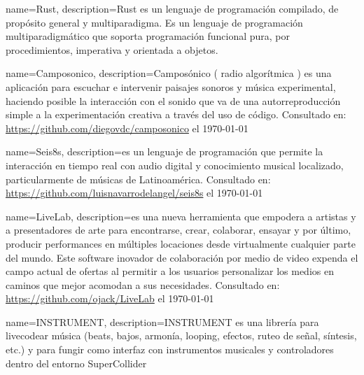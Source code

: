                 {
                   name=Rust,
    description={Rust es un lenguaje de programación compilado, de propósito general y multiparadigma. Es un lenguaje de programación multiparadigmático que soporta programación funcional pura, por procedimientos, imperativa y orientada a objetos.}}


                 {
                   name=Camposonico,
    description={Camposónico ( radio algorítmica ) es una aplicación para escuchar e intervenir paisajes sonoros y música experimental, haciendo posible la interacción con el sonido que va de una autorreproducción simple a la experimentación creativa a través del uso de código. Consultado en: \url{https://github.com/diegovdc/camposonico} el \today}}

                 {
                   name=Seis8s,
    description={es un lenguaje de programación que permite la interacción en tiempo real con audio digital y conocimiento musical localizado, particularmente de músicas de Latinoamérica. Consultado en: \url{https://github.com/luisnavarrodelangel/seis8s} el \today}}


                 {
                   name=LiveLab,
    description={es una nueva herramienta que empodera a artistas y a presentadores de arte para encontrarse, crear, colaborar, ensayar y por último, producir performances en múltiples locaciones desde virtualmente cualquier parte del mundo. Este software inovador de colaboración por medio de video expenda el campo actual de ofertas al permitir a los usuarios personalizar los medios en caminos que mejor acomodan a sus necesidades. Consultado en: \url{https://github.com/ojack/LiveLab} el \today}}


                 {
                   name=INSTRUMENT,
    description={INSTRUMENT es una librería para livecodear música (beats, bajos, armonía, looping, efectos, ruteo de señal, síntesis, etc.) y para fungir como interfaz con instrumentos musicales y controladores dentro del entorno SuperCollider}}

